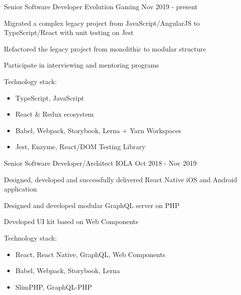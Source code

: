 

\begin{cventries}


  \cventry
    {Senior Software Developer} %
    {Evolution Gaming} %
    {} %
    {Nov 2019 - present} %
    {
      \begin{cvitems}
        \item Migrated a complex legacy project from JavaScript/AngularJS to TypeScript/React with unit testing on Jest
        \item Refactored the legacy project from monolithic to modular structure
        \item Participate in interviewing and mentoring programs
      \end{cvitems}
      \vspace{5mm}
      Technology stack:
      \begin{itemize}[leftmargin=2ex, nosep, noitemsep]
        \item TypeScript, JavaScript
        \item React \& Redux ecosystem
        \item Babel, Webpack, Storybook, Lerna + Yarn Workspaces
        \item Jest, Enzyme, React/DOM Testing Library
      \end{itemize}
      \vspace{-4.0mm}
    }

  \cventry
    {Senior Software Developer/Architect} %
    {IOLA} %
    {} %
    {Oct 2018 - Nov 2019} %
    {
      \begin{cvitems}
        \item Designed, developed and successfully delivered React Native iOS and Android application
        \item Designed and developed modular GraphQL server on PHP
        \item Developed UI kit based on Web Components
      \end{cvitems}
      \vspace{5mm}
      Technology stack:
      \begin{itemize}[leftmargin=2ex, nosep, noitemsep]
        \item React, React Native, GraphQL, Web Components
        \item Babel, Webpack, Storybook, Lerna
        \item SlimPHP, GraphQL-PHP
      \end{itemize}
      \vspace{-4.0mm}
    }


\end{cventries}
